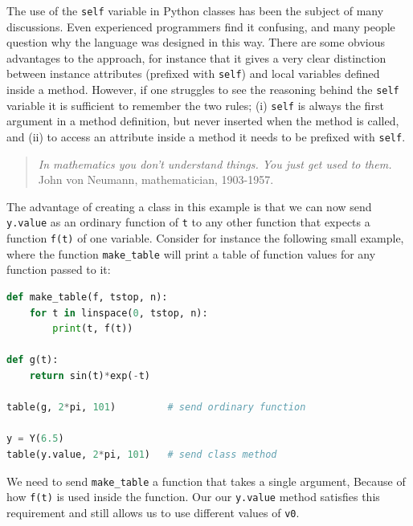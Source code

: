 \documentclass[graybox,envcountchap,sectrefs,final]{svmonodo}
\newenvironment{block_mdfboxadmon}[1][]{
\begin{block_mdfboxmdframed}[frametitle=#1]
}
{
\end{block_mdfboxmdframed}
}
\begin{document}
The use of the \texttt{self} variable in Python classes has been the subject of many discussions. Even experienced programmers
find it confusing, and many people question why the language was designed in this way. There are some obvious
advantages to the approach, for instance that it gives a very clear distinction between instance attributes (prefixed
with \texttt{self}) and local variables defined inside a method. However, if one struggles to see the reasoning behind
the \texttt{self} variable it is sufficient to remember the two rules; (i) \texttt{self} is always the first argument in a method definition,
but never inserted when the method is called, and (ii) to access an attribute inside a method it needs to be
prefixed with \texttt{self}.


\begin{block_mdfboxadmon}[]

\begin{quote}
\emph{In mathematics you
don't understand things. You just get used to them.}
John von Neumann, mathematician, 1903-1957.
\end{quote}
\end{block_mdfboxadmon} %



The advantage of creating a class in this example is that we can now send \texttt{y.value} as an ordinary function of \texttt{t} to
any other function that expects a function \texttt{f(t)} of one variable. Consider for instance the following small example, where
the function \Verb!make_table! will print a table of function values for any function passed to it:

\begin{lstlisting}[language=Python,style=blue1]
def make_table(f, tstop, n):
    for t in linspace(0, tstop, n):
        print(t, f(t))

def g(t):
    return sin(t)*exp(-t)

table(g, 2*pi, 101)         # send ordinary function

y = Y(6.5)
table(y.value, 2*pi, 101)   # send class method
\end{lstlisting}
We need to send \Verb!make_table! a function that takes a single argument, Because of how \texttt{f(t)} is used inside the function. Our
our \texttt{y.value} method satisfies this requirement and still allows us to use different values of \texttt{v0}.
\end{document}
